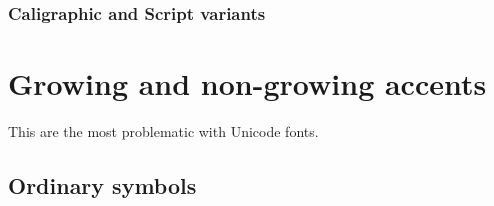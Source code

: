 \subsubsection{Caligraphic and Script variants}

\section{Growing and non-growing accents}

This are the most problematic with Unicode fonts.









 \subsection{Ordinary symbols}
